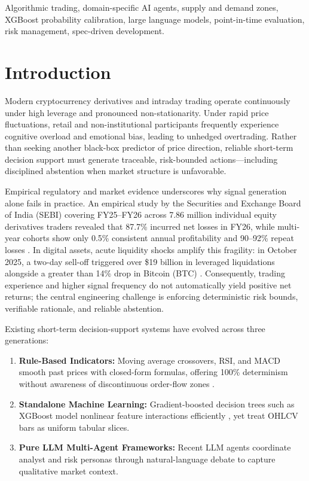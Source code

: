 \documentclass[conference]{IEEEtran}
\begin{document}
\begin{IEEEkeywords}
Algorithmic trading, domain-specific AI agents, supply and demand zones, XGBoost probability calibration, large language models, point-in-time evaluation, risk management, spec-driven development.
\end{IEEEkeywords}

\section{Introduction}
\label{sec:intro}

Modern cryptocurrency derivatives and intraday trading operate continuously under high leverage and pronounced non-stationarity. Under rapid price fluctuations, retail and non-institutional participants frequently experience cognitive overload and emotional bias, leading to unhedged overtrading. Rather than seeking another black-box predictor of price direction, reliable short-term decision support must generate traceable, risk-bounded actions—including disciplined abstention when market structure is unfavorable.

Empirical regulatory and market evidence underscores why signal generation alone fails in practice. An empirical study by the Securities and Exchange Board of India (SEBI) covering FY25--FY26 across 7.86 million individual equity derivatives traders revealed that 87.7\% incurred net losses in FY26, while multi-year cohorts show only 0.5\% consistent annual profitability and 90--92\% repeat losses \cite{sebi2026}. In digital assets, acute liquidity shocks amplify this fragility: in October 2025, a two-day sell-off triggered over \$19 billion in leveraged liquidations alongside a greater than 14\% drop in Bitcoin (BTC) \cite{reuters2025}. Consequently, trading experience and higher signal frequency do not automatically yield positive net returns; the central engineering challenge is enforcing deterministic risk bounds, verifiable rationale, and reliable abstention.

Existing short-term decision-support systems have evolved across three generations:
\begin{enumerate}
    \item \textbf{Rule-Based Indicators:} Moving average crossovers, RSI, and MACD smooth past prices with closed-form formulas, offering 100\% determinism without awareness of discontinuous order-flow zones \cite{brooks2012}.
    \item \textbf{Standalone Machine Learning:} Gradient-boosted decision trees such as XGBoost model nonlinear feature interactions efficiently \cite{chen2016,arxiv2407}, yet treat OHLCV bars as uniform tabular slices.
    \item \textbf{Pure LLM Multi-Agent Frameworks:} Recent LLM agents coordinate analyst and risk personas through natural-language debate to capture qualitative market context.
\end{enumerate}
\end{document}
